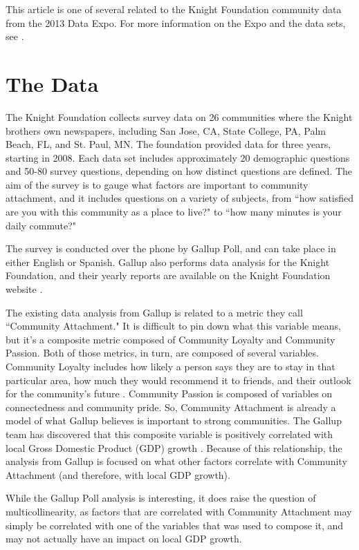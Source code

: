 \documentclass[smallextended]{svjour3}\usepackage[]{graphicx}\usepackage[]{color}
\begin{document}
This article is one of several related to the Knight Foundation community data from the 2013 Data Expo. For more information on the Expo and the data sets, see \citep{HofWic20XX}.

\section{The Data}
\label{data}
The Knight Foundation collects survey data on 26 communities where the Knight brothers own newspapers, including San Jose, CA, State College, PA, Palm Beach, FL, and St. Paul, MN. The foundation provided data for three years, starting in 2008. Each data set includes approximately 20 demographic questions and 50-80 survey questions, depending on how distinct questions are defined. The aim of the survey is to gauge what factors are important to community attachment, and it includes questions on a variety of subjects, from ``how satisfied are you with this community as a place to live?" to ``how many minutes is your daily commute?"

The survey is conducted over the phone by Gallup Poll, and can take place in either English or Spanish. Gallup also performs data analysis for the Knight Foundation, and their yearly reports are available on the Knight Foundation website \citep{KF2008, KF2009, KF2010}. 

The existing data analysis from Gallup is related to a metric they call ``Community Attachment." It is difficult to pin down what this variable means, but it's a composite metric composed of Community Loyalty and Community Passion. Both of those metrics, in turn, are composed of several variables. Community Loyalty includes how likely a person says they are to stay in that particular area, how much they would recommend it to friends, and their outlook for the community's future \citep{KF2010}. Community Passion is composed of variables on connectedness and community pride. So, Community Attachment is already a model of what Gallup believes is important to strong communities. The Gallup team has discovered that this composite variable is positively correlated with local Gross Domestic Product (GDP) growth \citep{KF2010b}. Because of this relationship, the analysis from Gallup is focused on what other factors correlate with Community Attachment (and therefore, with local GDP growth). 

While the Gallup Poll analysis is interesting, it does raise the question of multicollinearity, as factors that are correlated with Community Attachment may simply be correlated with one of the variables that was used to compose it, and may not actually have an impact on local GDP growth. 
\end{document}

